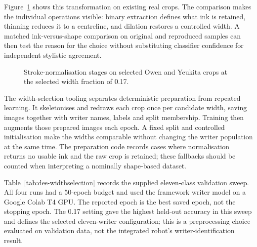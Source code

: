 Figure~\ref{fig:des-strokenorm} shows this transformation on existing real crops. The comparison makes the individual operations visible: binary extraction defines what ink is retained, thinning reduces it to a centreline, and dilation restores a controlled width. A matched ink-versus-shape comparison on original and reproduced samples can then test the reason for the choice without substituting classifier confidence for independent stylistic agreement.~\cite[recognise.py; train.py]{braunepipeline2026}


\begin{figure}[!htbp]\centering
{}
\caption{Stroke-normalisation stages on selected Owen and Yeukita crops at the selected width fraction of 0.17.~\cite{brauneevidence2026,braunepipeline2026}}
\label{fig:des-strokenorm}
\end{figure}


The width-selection tooling separates deterministic preparation from repeated learning. It skeletonises and redraws each crop once per candidate width, saving images together with writer names, labels and split membership. Training then augments those prepared images each epoch. A fixed split and controlled initialisation make the widths comparable without changing the writer population at the same time. The preparation code records cases where normalisation returns no usable ink and the raw crop is retained; these fallbacks should be counted when interpreting a nominally shape-based dataset.~\cite[recognise.py; train.py; trainlibrary.py]{braunepipeline2026}

Table~\ref{tab:des-widthselection} records the supplied eleven-class validation sweep. All four runs had a 50-epoch budget and used the framework writer model on a Google Colab T4 GPU. The reported epoch is the best saved epoch, not the stopping epoch. The 0.17 setting gave the highest held-out accuracy in this sweep and defines the selected eleven-writer configuration; this is a preprocessing choice evaluated on validation data, not the integrated robot's writer-identification result.~\cite[training records]{brauneevidence2026}


